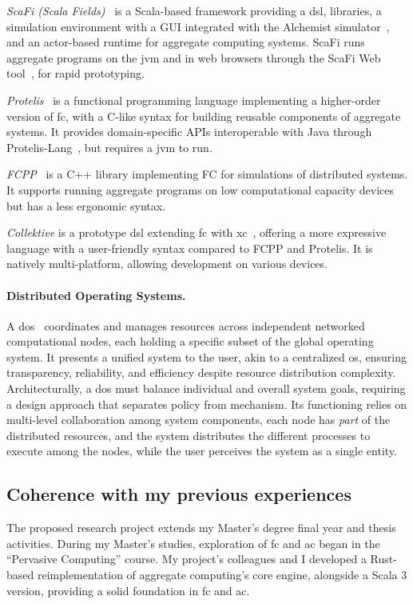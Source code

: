 \documentclass[12pt, a4paper]{article}
\begin{document}
\emph{ScaFi (Scala Fields)}~\cite{scafi} is a Scala-based framework providing a \ac{dsl}, libraries,
a simulation environment with a GUI integrated with the Alchemist simulator~\cite{PianiniJOS2013},
and an actor-based runtime for aggregate computing systems.
%
ScaFi runs aggregate programs on the \ac{jvm} and in web browsers through the ScaFi Web tool~\cite{Coordination2021-scafiweb}, for rapid prototyping.

\emph{Protelis}~\cite{PianiniSAC2015} is a functional programming language implementing a higher-order version of \ac{fc},
with a C-like syntax for building reusable components of aggregate systems.
%
It provides domain-specific APIs interoperable with Java through Protelis-Lang~\cite{SASO2017-protelislang}, but requires a \ac{jvm} to run.

\emph{FCPP}~\cite{DBLP:journals/scp/AudritoT24} is a C++ library implementing FC for simulations of distributed systems.
%
It supports running aggregate programs on low computational capacity devices but has a less ergonomic syntax.

\emph{Collektive} is a prototype \ac{dsl} extending \ac{fc} with \ac{xc}~\cite{AudritoCDSV24},
offering a more expressive language with a user-friendly syntax compared to FCPP and Protelis.
%
It is natively multi-platform, allowing development on various devices.

\sloppypar
\paragraph{Distributed Operating Systems.}
A \ac{dos}~\cite{dos} coordinates and manages resources across independent networked computational nodes,
each holding a specific subset of the global operating system.
%
It presents a unified system to the user,
akin to a centralized \ac{os}, ensuring transparency, reliability, and efficiency despite resource distribution complexity.
%
%
Architecturally,
a \ac{dos} must balance individual and overall system goals,
requiring a design approach that separates policy from mechanism.
%
Its functioning relies on multi-level collaboration among system components,
each node has \emph{part} of the distributed resources, and the system distributes the different processes to execute among the nodes,
while the user perceives the system as a single entity.

\subsection{Coherence with my previous experiences}
\label{subsec:coherence-with-the-educational-path}
The proposed research project extends my Master’s degree final year and thesis activities.
%
During my Master’s studies, exploration of  \ac{fc} and \ac{ac} began in the “Pervasive Computing” course.
%
My project's colleagues and I developed a Rust-based reimplementation of aggregate computing's core engine,
alongside a Scala 3 version, providing a solid foundation in \ac{fc} and \ac{ac}.
\end{document}

